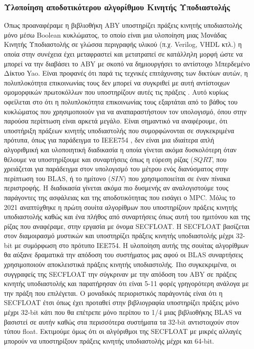 \subsubsection{Υλοποίηση αποδοτικότερου αλγορίθμου Κινητής Υποδιαστολής}
Όπως προαναφέραμε η βιβλιοθήκη ABY υποστηρίζει πράξεις κινητής υποδιαστολής μόνο μέσω Boolean κυκλώματος, το οποίο είναι μια υλοποίηση μιας Μονάδας Κινητής Υποδιαστολής σε γλώσσα περιγραφής υλικού (π.χ. Verilog, VHDL κτλ.) η οποία στην συνέχεια έχει μεταφραστεί και μετατραπεί σε κατάλληλη μορφή ώστε να μπορεί να την διαβάσει το ABY με σκοπό να δημιουργήσει το αντίστοιχο Μπερδεμένο Δίκτυο Yao. Είναι προφανές ότι παρά τις τεχνικές επιτάχυνσης των δικτύων αυτών, η πολυπλοκότητα επικοινωνίας τους δεν μπορεί να συγκριθεί με αυτή αντίστοιχων ομομορφικών πρωτοκόλλων που υποστηρίζουν αυτές τις πράξεις \cite{cryptoeprint:2022/322} \cite{alxd1}. Αυτό κυρίως οφείλεται στο ότι η πολυπλοκότητα επικοινωνίας τους εξαρτάται από το βάθος του κυκλώματος που χρησιμοποιούν για να αναπαραστήστουν τον υπολογισμό, όπου στην παρούσα περίπτωση είναι αρκετά μεγάλο. Είναι σημαντικό να αναφέρουμε, ότι υποστήριξη πράξεων κινητής υποδιαστολής που συμορφώνονται σε συγκεκριμένα πρότυπα, όπως για παράδειγμα το IEEE754 \cite{8766229}, δεν είναι μια ιδιαίτερα απλή αλγοριθμική και υλοποιητική διαδικασία \cite{10.5555/1096483} η οποία γίνεται ακόμα δυσκολότερη όταν θέλουμε να υποστηρίξουμε και συναρτήσεις όπως η εύρεση ρίζας ($SQRT$, που χρειάζεται για παράδειγμα στον υπολογισμό του μέτρου ενός διανύσματος στην περίπτωση του BLAS, ή το ημίτονο ($SIN$) που χρησιμοποιείται σε έναν πίνακα περιστροφής. Η διαδικασία γίνεται ακόμα πιο δυσμενής αν αναλογιστούμε τους παράγοντες της ασφάλειας και της αποδοτικότητας που εισάγει ο MPC. Μόλις το 2021 αναπτύχθηκε η πρώτη σουίτα αλγορίθμων που υποστηρίζουν πράξεις κινητής υποδιαστολής καθώς και ένα πλήθος από συναρτήσεις όπως αυτή του ημιτόνου και της ρίζας που αναφέραμε, στην εργασία \cite{cryptoeprint:2022/322} με όνομα SECFLOAT. Η SECFLOAT βασίζεται στον διαμοιρασμό μυστικών και υποστηρίζει πράξεις κινητής υποδιαστολής μέχρι 32-bit με συμόρφωση στο πρότυπο IEE754. Η υλοποίηση αυτής της σουίτας αλγορίθμων θα αύξανε δραματικά την απόδοση του συστήματος μας αφού οι BLAS συναρτήσεις χρησιμοποιούν αποκλειστικά πράξεις κινητής υποδιαστολής. Πιο συγκεκριμένα, οι συγγραφείς της SECFLOAT την σύγκριναν με την απόδοση του ABY σε πράξεις κινητής υποδιαστολής και παρατήρησαν ότι είναι 5-11 φορές γρηγορότερη ανάλογα με την πράξη που επιλέγεται. Ο μοναδικός περιοριστικός παράγοντάς είναι ότι η SECFLOAT έτσι όπως έχει προταθεί στην βιβλιογραφία υποστηρίζει πράξεις μόνο μέχρι 32-bit κάτι που θα επέτρεπε μόνο περίπου το 1/4 μιας βιβλιοθήκης BLAS να βασιστεί σε αυτήν καθώς στα περισσότερα συστήματα τα 32-bit αντιστοιχούν στον τύπου float. Εκτιμούμε όμως ότι οι αλγόριθμοι της SECFLOAT με μικρές αλλαγές μπορούν να υποστηρίξουν πράξεις κινητής υποδιαστολής μέχρι και 64-bit.

